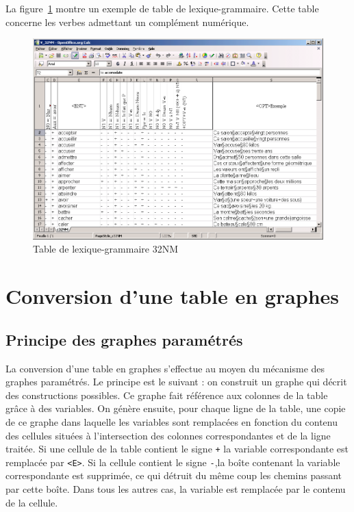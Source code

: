 \bigskip
\noindent La figure~\ref{fig-table-32NM} montre un exemple de table de lexique-grammaire. Cette
table concerne les verbes admettant un complément numérique.


\begin{figure}[!ht]
\begin{center}
\includegraphics[width=15cm]{resources/img/fig8-1.png}
\caption{Table de lexique-grammaire 32NM\label{fig-table-32NM}}
\end{center}
\end{figure}

\section{Conversion d’une table en graphes}
\subsection{Principe des graphes paramétrés}
La conversion d’une table en graphes s’effectue au moyen du mécanisme des graphes
paramétrés. Le principe est le suivant : on construit un graphe qui décrit des constructions
possibles. Ce graphe fait référence aux colonnes de la table grâce à des variables. On génère
ensuite, pour chaque ligne de la table, une copie de ce graphe dans laquelle les variables
sont remplacées en fonction du contenu des cellules situées à l’intersection des colonnes
correspondantes et de la ligne traitée. Si une cellule de la table contient le signe
 \verb$+$ la variable correspondante est remplacée par \verb+<E>+. Si la cellule contient le signe
\verb+-+,la boîte contenant la variable correspondante est supprimée, ce qui détruit du même coup
les chemins passant par cette boîte. Dans tous les autres cas, la variable est remplacée par le
contenu de la cellule.




